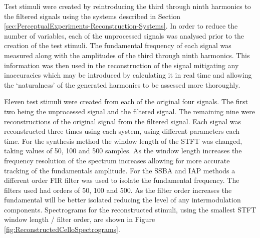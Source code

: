 			Test stimuli were created by reintroducing the third through ninth harmonics to the filtered signals
			using the systems described in Section \ref{sec:PerceptualExperiments-Reconstruction-Systems}. In
			order to reduce the number of variables, each of the unprocessed signals was analysed prior to the
			creation of the test stimuli. The fundamental frequency of each signal was measured along with the
			amplitudes of the third through ninth harmonics. This information was then used in the
			reconstruction of the signal mitigating any inaccuracies which may be introduced by calculating it
			in real time and allowing the `naturalness' of the generated harmonics to be assessed more
			thoroughly.

			Eleven test stimuli were created from each of the original four signals. The first two being the
			unprocessed signal and the filtered signal. The remaining nine were reconstructions of the original
			signal from the filtered signal. Each signal was reconstructed three times using each system, using
			different parameters each time. For the synthesis method the window length of the STFT was changed,
			taking values of 50, 100 and 500 samples. As the window length increases the frequency resolution of
			the spectrum increases allowing for more accurate tracking of the fundamentals amplitude. For the
			SSBA and IAP methods a different order FIR filter was used to isolate the fundamental frequency. The
			filters used had orders of 50, 100 and 500. As the filter order increases the fundamental will be
			better isolated reducing the level of any intermodulation components. Spectrograms for the
			reconstructed stimuli, using the smallest STFT window length / filter order, are shown in Figure
			\ref{fig:ReconstructedCelloSpectrograms}.

